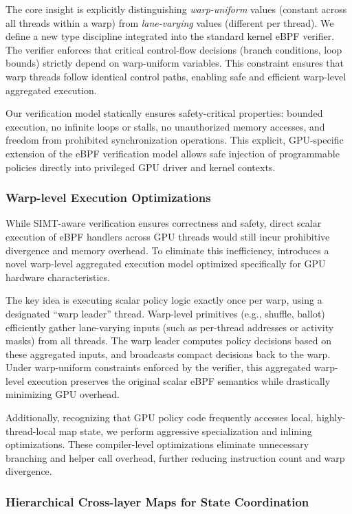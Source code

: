 The core insight is explicitly distinguishing \emph{warp-uniform} values (constant across all threads within a warp) from \emph{lane-varying} values (different per thread). We define a new type discipline integrated into the standard kernel eBPF verifier. The verifier enforces that critical control-flow decisions (branch conditions, loop bounds) strictly depend on warp-uniform variables. This constraint ensures that warp threads follow identical control paths, enabling safe and efficient warp-level aggregated execution.

Our verification model statically ensures safety-critical properties: bounded execution, no infinite loops or stalls, no unauthorized memory accesses, and freedom from prohibited synchronization operations. This explicit, GPU-specific extension of the eBPF verification model allows safe injection of programmable policies directly into privileged GPU driver and kernel contexts.

\subsubsection{Warp-level Execution Optimizations}

While SIMT-aware verification ensures correctness and safety, direct scalar execution of eBPF handlers across GPU threads would still incur prohibitive divergence and memory overhead. To eliminate this inefficiency, \sys introduces a novel warp-level aggregated execution model optimized specifically for GPU hardware characteristics.

The key idea is executing scalar policy logic exactly once per warp, using a designated ``warp leader'' thread. Warp-level primitives (e.g., shuffle, ballot) efficiently gather lane-varying inputs (such as per-thread addresses or activity masks) from all threads. The warp leader computes policy decisions based on these aggregated inputs, and broadcasts compact decisions back to the warp. Under warp-uniform constraints enforced by the verifier, this aggregated warp-level execution preserves the original scalar eBPF semantics while drastically minimizing GPU overhead.

Additionally, recognizing that GPU policy code frequently accesses local, highly-thread-local map state, we perform aggressive specialization and inlining optimizations. These compiler-level optimizations eliminate unnecessary branching and helper call overhead, further reducing instruction count and warp divergence.

\subsubsection{Hierarchical Cross-layer Maps for State Coordination}

